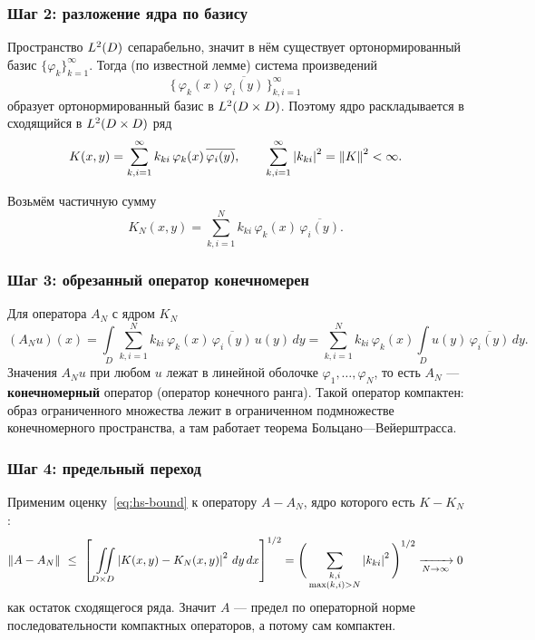\subsubsection*{Шаг 2: разложение ядра по базису}

Пространство $L^{2}(D)$ сепарабельно, значит в нём существует
ортонормированный базис $\{\varphi_k\}_{k=1}^{\infty}$. Тогда (по известной
лемме) система произведений
\[
  \big\{\, \varphi_k(x)\,\overline{\varphi_i(y)} \,\big\}_{k,i=1}^{\infty}
\]
образует ортонормированный базис в $L^{2}(D \times D)$. Поэтому ядро
раскладывается в сходящийся в $L^{2}(D\times D)$ ряд
\[
  K(x,y) = \sum_{k,i=1}^{\infty} k_{ki}\, \varphi_k(x)\,\overline{\varphi_i(y)} ,
  \qquad
  \sum_{k,i=1}^{\infty} \left\lvert k_{ki} \right\rvert^2 = \left\lVert K \right\rVert^2 < \infty .
\]

Возьмём частичную сумму
\[
  K_N(x,y) = \sum_{k,i=1}^{N} k_{ki}\, \varphi_k(x)\,\overline{\varphi_i(y)} .
\]

\subsubsection*{Шаг 3: обрезанный оператор конечномерен}

Для оператора $A_N$ с ядром $K_N$
\[
  (A_N u)(x)
  = \int\limits_{D} \sum_{k,i=1}^{N} k_{ki}\,\varphi_k(x)\,\overline{\varphi_i(y)}\,
    u(y)\, dy
  = \sum_{k,i=1}^{N} k_{ki}\,\varphi_k(x)
    \int\limits_{D} u(y)\,\overline{\varphi_i(y)}\, dy .
\]
Значения $A_N u$ при любом $u$ лежат в линейной оболочке
$\varphi_1,\dots,\varphi_N$, то есть $A_N$ — \textbf{конечномерный} оператор
(оператор конечного ранга). Такой оператор компактен: образ ограниченного
множества лежит в ограниченном подмножестве конечномерного пространства, а
там работает теорема Больцано—Вейерштрасса.

\subsubsection*{Шаг 4: предельный переход}

Применим оценку~\eqref{eq:hs-bound} к оператору $A - A_N$, ядро которого есть
$K - K_N$:
\[
  \left\lVert A - A_N \right\rVert
  \ \le\ \left[\ \iint\limits_{D \times D}
  \left\lvert K(x,y) - K_N(x,y) \right\rvert^2\, dy\, dx \right]^{1/2}
  = \Bigg(\sum_{\substack{k,i \\ \max(k,i) > N}} \left\lvert k_{ki} \right\rvert^2\Bigg)^{1/2}
  \xrightarrow[N \to \infty]{} 0
\]
как остаток сходящегося ряда. Значит $A$ — предел по операторной норме
последовательности компактных операторов, а потому сам компактен.

